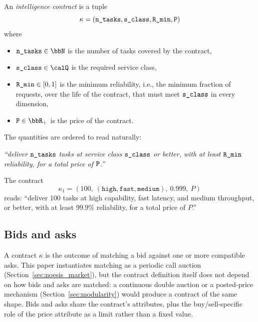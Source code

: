 \begin{definition}
\label{def:contract}
An \emph{intelligence contract} is a tuple
$$
  \kappa = ( \textnormal{\texttt{n\_tasks}}, \textnormal{\texttt{s\_class}}, \textnormal{\texttt{R\_min}}, \textnormal{\texttt{P}} )
$$
where
\begin{itemize}
  \item $\ntasksattr \in \bbN$ is the number of tasks covered by the
    contract,
  \item $\sclassattr \in \calQ$ is the required service class,
  \item $\textnormal{\texttt{R\_min}} \in [0, 1]$ is the minimum reliability, i.e., the
    minimum fraction of requests, over the life of the contract, that must
    meet $\textnormal{\texttt{s\_class}}$ in every dimension,
  \item $\priceattr \in \bbR_+$ is the price of the contract.
\end{itemize}
\end{definition}

The quantities are ordered to read naturally: 

\emph{``deliver $\textnormal{\texttt{n\_tasks}}$ tasks at service class $\textnormal{\texttt{s\_class}}$ or
better, with at least $\textnormal{\texttt{R\_min}}$ reliability, for a total price of
$\textnormal{\texttt{P}}$.''}

\begin{example}
\label{ex:contract}
The contract
$$
  \kappa_1 =
  (100,\ (\texttt{high}, \texttt{fast}, \texttt{medium}),\ 0.999,\ P)
$$
reads: ``deliver 100 tasks at high capability, fast latency, and medium
throughput, or better, with at least 99.9\% reliability, for a total price of
$P$.''
\end{example}

\subsection{Bids and asks}
\label{sec:bids_asks}

A contract $\kappa$ is the outcome of \NoesisMarket{} matching a bid
against one or more compatible asks. This paper instantiates matching as
a periodic call auction (Section~\ref{sec:noesis_market}), but the
contract definition itself does not depend on how bids and asks are
matched: a continuous double auction or a posted-price mechanism
(Section~\ref{sec:modularity}) would produce a contract of the same
shape. Bids and asks share the contract's attributes, plus the
buy/sell-specific role of the price attribute as a limit rather than a
fixed value.

